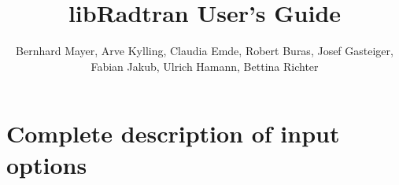 \documentclass[11pt,twoside,a4paper,fleqn]{book}
\title{libRadtran User's Guide}
\author{Bernhard Mayer, Arve Kylling, Claudia Emde,
  Robert Buras, Josef Gasteiger, Fabian Jakub, Ulrich Hamann, Bettina Richter}
\begin{document}

 

%
\newpage
\thispagestyle{empty}
\rule{0pt}{10pt}
\newpage

\tableofcontents

\cleardoublepage











\chapter{Complete description of input options}
\label{chap:complete-description-input-options}



\clearpage 


\clearpage 
{}
{}


\clearpage
{}
{}
\printindex
\end{document}
